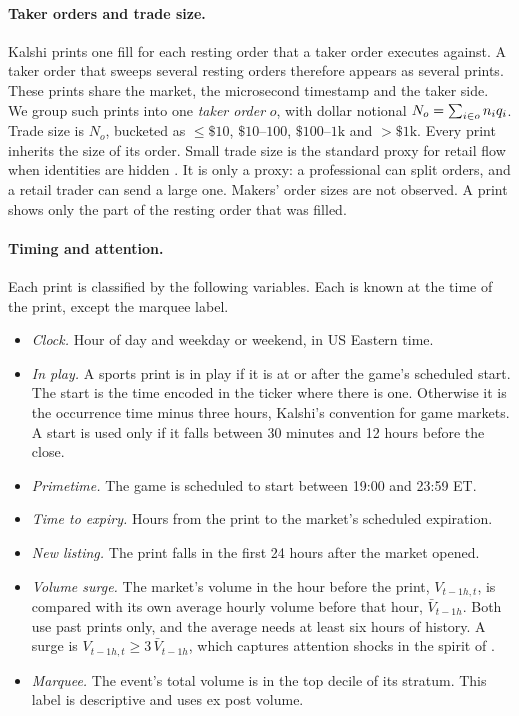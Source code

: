 \paragraph{Taker orders and trade size.} Kalshi prints one fill for each resting order that a
taker order executes against. A taker order that sweeps several resting orders therefore
appears as several prints. These prints share the market, the microsecond timestamp and the
taker side. We group such prints into one \emph{taker order} $o$, with dollar notional
$N_o=\sum_{i\in o} n_iq_i$. Trade size is $N_o$, bucketed as $\le\$10$, $\$10$--$100$,
$\$100$--$1\text{k}$ and $>\$1\text{k}$. Every print inherits the size of its order. Small trade
size is the standard proxy for retail flow when identities are hidden
\citep{leeradhakrishna2000,barberodeanzhu2009}. It is only a proxy: a professional can split
orders, and a retail trader can send a large one. Makers' order sizes are not observed. A
print shows only the part of the resting order that was filled.

\paragraph{Timing and attention.} Each print is classified by the following variables. Each is
known at the time of the print, except the marquee label.
\begin{itemize}
  \item \emph{Clock.} Hour of day and weekday or weekend, in US Eastern time.
  \item \emph{In play.} A sports print is in play if it is at or after the game's scheduled
  start. The start is the time encoded in the ticker where there is one. Otherwise it is the
  occurrence time minus three hours, Kalshi's convention for game markets. A start is used only
  if it falls between 30 minutes and 12 hours before the close.
  \item \emph{Primetime.} The game is scheduled to start between 19:00 and 23:59 ET.
  \item \emph{Time to expiry.} Hours from the print to the market's scheduled expiration.
  \item \emph{New listing.} The print falls in the first 24 hours after the market opened.
  \item \emph{Volume surge.} The market's volume in the hour before the print, $V_{t-1h,t}$, is
  compared with its own average hourly volume before that hour, $\bar V_{t-1h}$. Both use past
  prints only, and the average needs at least six hours of history. A surge is
  $V_{t-1h,t}\ge3\,\bar V_{t-1h}$, which captures attention shocks in the spirit of
  \citet{barberodean2008}.
  \item \emph{Marquee.} The event's total volume is in the top decile of its stratum. This label
  is descriptive and uses ex post volume.
\end{itemize}

